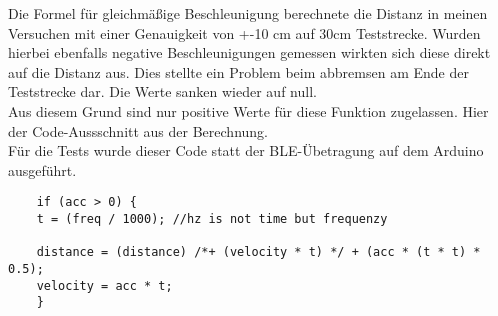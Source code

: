 Die Formel für gleichmäßige Beschleunigung berechnete 
die Distanz in meinen Versuchen mit einer Genauigkeit von
+-10 cm auf 30cm Teststrecke. Wurden hierbei ebenfalls 
negative Beschleunigungen gemessen wirkten sich diese direkt
auf die Distanz aus. Dies stellte ein Problem beim abbremsen
am Ende der Teststrecke dar. Die Werte sanken wieder auf null.\\
Aus diesem Grund sind nur positive Werte für diese Funktion 
zugelassen. Hier der Code-Aussschnitt aus der Berechnung.\\
Für die Tests wurde dieser Code statt der BLE-Übetragung 
auf dem Arduino ausgeführt.

\begin{verbatim}
    if (acc > 0) {
    t = (freq / 1000); //hz is not time but frequenzy

    distance = (distance) /*+ (velocity * t) */ + (acc * (t * t) * 0.5);
    velocity = acc * t;
    }
\end{verbatim}
